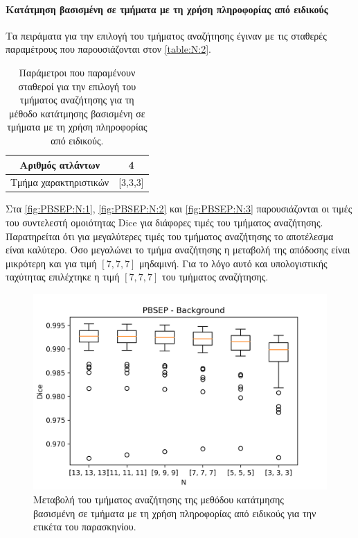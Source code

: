 \documentclass[a4paper,12pt]{article}
\newcommand{\paragraphLine}[1]{\paragraph{#1}\mbox{}}
\begin{document}
\paragraphLine{Κατάτμηση βασισμένη σε τμήματα με τη χρήση πληροφορίας από
               ειδικούς}

Τα πειράματα για την επιλογή του τμήματος αναζήτησης έγιναν με τις σταθερές
παραμέτρους που παρουσιάζονται στον \autoref{table:N:2}.

\begin{table}[h!]
    \centering
    \begin{tabular}{|c|c|} 
        \hline
        Αριθμός ατλάντων & 4 \\ 
        \hline
        Τμήμα χαρακτηριστικών & [3,3,3] \\ 
        \hline
    \end{tabular}
    \caption{Παράμετροι που παραμένουν σταθεροί για την επιλογή του τμήματος
             αναζήτησης για τη μέθοδο κατάτμησης βασισμένη σε τμήματα με τη
             χρήση πληροφορίας από ειδικούς.}
    \label{table:N:2}
\end{table}

Στα \autoref{fig:PBSEP:N:1}, \autoref{fig:PBSEP:N:2} και \autoref{fig:PBSEP:N:3}
παρουσιάζονται οι τιμές του συντελεστή ομοιότητας Dice για διάφορες τιμές του
τμήματος αναζήτησης. Παρατηρείται ότι για μεγαλύτερες τιμές του τμήματος
αναζήτησης το αποτέλεσμα είναι καλύτερο. Όσο μεγαλώνει το τμήμα αναζήτησης η
μεταβολή της απόδοσης είναι μικρότερη και για τιμή $[7,7,7]$ μηδαμινή. Για το
λόγο αυτό και υπολογιστικής ταχύτητας επιλέχτηκε η τιμή $[7,7,7]$ του τμήματος
αναζήτησης.

\begin{figure}[H]
    \centering
    \includegraphics[width=0.85\linewidth]{PBSEP_N_Background_plot.png}
    \caption{Μεταβολή του τμήματος αναζήτησης της μεθόδου κατάτμησης βασισμένη
             σε τμήματα με τη χρήση πληροφορίας από ειδικούς για την ετικέτα του
             παρασκηνίου.}
    \label{fig:PBSEP:N:1}
\end{figure}
\end{document}
